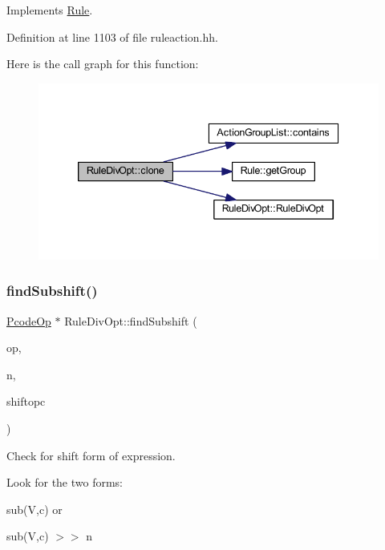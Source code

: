 Implements \mbox{\hyperlink{class_rule_a70de90a76461bfa7ea0b575ce3c11e4d}{Rule}}.



Definition at line 1103 of file ruleaction.\+hh.

Here is the call graph for this function\+:
\nopagebreak
\begin{figure}[H]
\begin{center}
\leavevmode
\includegraphics[width=339pt]{class_rule_div_opt_a4fb0c5c3f7dec93f20d65f1919693802_cgraph}
\end{center}
\end{figure}
\mbox{\label{class_rule_div_opt_abcf7a06a2ba2e6e745b33499d4c55751}} 
\subsubsection{\texorpdfstring{findSubshift()}{findSubshift()}}
{\footnotesize\ttfamily \mbox{\hyperlink{class_pcode_op}{Pcode\+Op}} $\ast$ Rule\+Div\+Opt\+::find\+Subshift (\begin{DoxyParamCaption}\item[{\mbox{\hyperlink{class_pcode_op}{Pcode\+Op}} $\ast$}]{op,  }\item[{int4 \&}]{n,  }\item[{\mbox{\hyperlink{opcodes_8hh_abeb7dfb0e9e2b3114e240a405d046ea7}{Op\+Code}} \&}]{shiftopc }\end{DoxyParamCaption})\hspace{0.3cm}{\ttfamily [static]}}



Check for shift form of expression. 

Look for the two forms\+:
\begin{DoxyItemize}
\item {\ttfamily sub(\+V,c)} or
\item {\ttfamily sub(\+V,c) $>$$>$ n}
\end{DoxyItemize}

